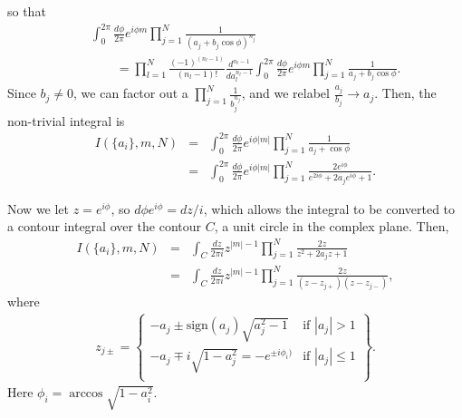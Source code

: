 \documentclass[aps,prc,preprint,tightenlines]{revtex4}
\begin{document}
so that
\begin{eqnarray}
&&\int_0^{2\pi} \frac{d\phi}{2\pi} e^{i \phi m}
\prod_{j=1}^N \frac{1}{(a_j + b_j \cos \phi)^{n_j}} \nonumber\\
&&\qquad =
\prod_{l=1}^N \frac{(-1)^{(n_l-1)}}{(n_l-1)!} \frac{d^{n_l-1}}{d a_l^{n_l-1}}
\int_0^{2\pi} \frac{d\phi}{2\pi} e^{i \phi m} 
\prod_{j=1}^N \frac{1}{a_j + b_j \cos \phi}. \label{a:ci:firstint}
\end{eqnarray}
Since $b_j\neq0$, we can factor out a
$\prod_{j=1}^N\frac{1}{b_j^{n_j}}$, and we relabel
$\frac{a_j}{b_j}\rightarrow a_j$. Then, the non-trivial integral is
\begin{eqnarray}
I(\{a_i\},m,N)
&=&
\int_0^{2\pi} \frac{d\phi}{2\pi} e^{i \phi |m|} 
\prod_{j=1}^N \frac{1}{a_j + \cos \phi} \nonumber \\
&=&
\int_0^{2\pi} \frac{d\phi}{2\pi} e^{i \phi |m|} 
\prod_{j=1}^N \frac{2 e^{i \phi}}
{e^{2 i \phi} + 2a_j e^{i \phi} + 1}.
\end{eqnarray}

Now we let $z=e^{i\phi}$, so $d\phi e^{i\phi}= dz/i$, which allows the
integral to be converted to a contour integral over the contour $C$, a
unit circle in the complex plane. Then,
\begin{eqnarray}
I(\{a_i\},m,N) 
&=&
\int_C \frac{dz}{2\pi i} z^{|m|-1}
\prod_{j=1}^N \frac{2 z}{z^2 + 2a_j z + 1} \nonumber \\
&=&
\int_C \frac{dz}{2\pi i} z^{|m|-1}
\prod_{j=1}^N \frac{2 z}{(z-z_{j+})(z-z_{j-})},
\end{eqnarray}
where
\begin{eqnarray}
z_{j\pm} = \left\{
\begin{array}{ll}
-a_j \pm \mbox{sign}(a_j) \sqrt{a_j^2 -  1 }
& \mbox{if } |a_j| > 1 \\
-a_j \mp i\sqrt{ 1  - a_j^2} = -e^{\pm i \phi_i)} 
& \mbox{if } |a_j|\leq 1 \\ 
\end{array} \right\}.
\end{eqnarray}
Here $\phi_i=\arccos \sqrt{1-a_i^2}$.
\end{document}
